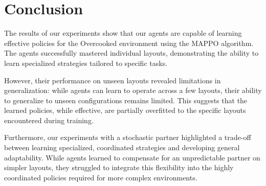 \documentclass{article}
\begin{document}
\section{Conclusion}
The results of our experiments show that our agents are capable of learning effective policies for the Overcooked environment using the MAPPO algorithm. The agents successfully mastered individual layouts, demonstrating the ability to learn specialized strategies tailored to specific tasks. 

However, their performance on unseen layouts revealed limitations in generalization: while agents can learn to operate across a few layouts, their ability to generalize to unseen configurations remains limited. This suggests that the learned policies, while effective, are partially overfitted to the specific layouts encountered during training.

Furthermore, our experiments with a stochastic partner highlighted a trade-off between learning specialized, coordinated strategies and developing general adaptability. While agents learned to compensate for an unpredictable partner on simpler layouts, they struggled to integrate this flexibility into the highly coordinated policies required for more complex environments.



\end{document}
